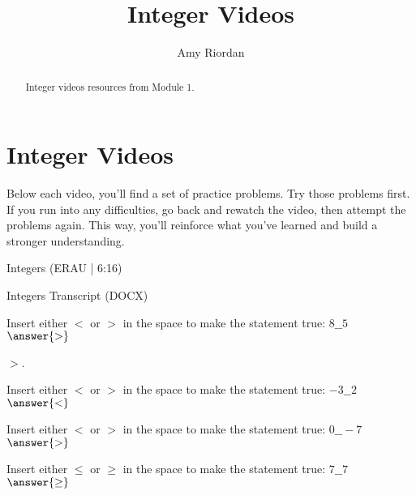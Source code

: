 \documentclass{ximera}
\title{Integer Videos}
\author{Amy Riordan}
\begin{document}
\begin{abstract}
Integer videos resources from Module 1.
\end{abstract}
\maketitle

\section*{Integer Videos}

Below each video, you'll find a set of practice problems. Try those problems first. If you run into any difficulties, go back and rewatch the video, then attempt the problems again. This way, you'll reinforce what you’ve learned and build a stronger understanding.

Integers (ERAU | 6:16)


Integers Transcript (DOCX)


\begin{problem}
Insert either $<$ or $>$ in the space to make the statement true: $8\_\_5$\\
$\answer{>}$

\begin{feedback}
$>$.
\end{feedback}

\end{problem}

\begin{problem}
Insert either $<$ or $>$ in the space to make the statement true: $-3\_\_2$\\
$\answer{<}$
\end{problem}

\begin{problem}
Insert either $<$ or $>$ in the space to make the statement true: $0\_\_-7$\\
$\answer{>}$
\end{problem}



\begin{problem}
Insert either $\leq$ or $\geq$ in the space to make the statement true: $7\_\_7$\\
$\answer{\geq}$
\end{problem}
\end{document}
